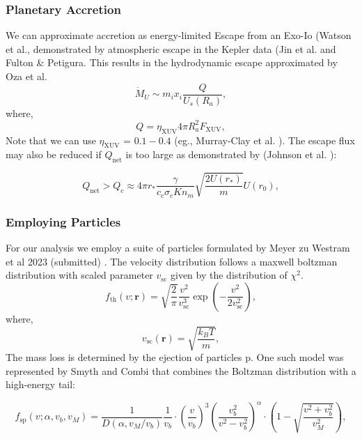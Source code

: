 \documentclass[journal,article,submit,pdftex,moreauthors]{Definitions/mdpi}
\begin{document}
\subsubsection{Planetary Accretion}
We can approximate accretion as energy-limited Escape from an Exo-Io (Watson et al.\cite{Watson_1981}, demonstrated by atmospheric escape in the Kepler data (Jin et al. \cite{Jin_2014} and Fulton
\& Petigura\cite{Fulton_Petigura_2018}. This results in the hydrodynamic escape approximated by Oza et al. \cite{Oza_2019}
\begin{equation}
\dot{M}_U \sim m_i x_i \frac{Q}{U_s\left(R_a\right)} ,
\end{equation}
where,
\begin{equation}
Q=\eta_{\mathrm{XUV}} 4 \pi R_a^2 F_{\mathrm{XUV}} ,
\end{equation}
Note that we can use $\eta_{\mathrm{XUV}}$ = $0.1 - 0.4$ (eg., Murray-Clay et al. \cite{Murray-Clay_2009}). The escape flux may also be reduced if $Q_\mathrm{net}$ is too large as demonstrated by (Johnson et al. \cite{Johnson_2013_Erratum}):

\begin{equation}
Q_{\mathrm{net}}>Q_c \approx 4 \pi r_* \frac{\gamma}{c_c \sigma_c K n_m} \sqrt{\frac{2 U\left(r_*\right)}{m}} U\left(r_0\right) ,
\end{equation}

\subsubsection{Employing Particles}
For our analysis we employ a suite of particles formulated by Meyer zu Westram et al 2023 (submitted) \cite{Meyer_zu_Westram}. The velocity distribution follows a maxwell boltzman distribution with scaled parameter $v_{\mathrm{sc}}$ given by the distribution of $\chi^2$. 
\begin{equation}
    f_{\mathrm{th}}(v ; \mathbf{r})=\sqrt{\frac{2}{\pi}} \frac{v^2}{v_{\mathrm{sc}}^3} \exp \left(-\frac{v^2}{2 v_{\mathrm{sc}}^2}\right) ,
\end{equation}
where,
\begin{equation}
    v_{\mathrm{sc}}(\mathbf{r})=\sqrt{\frac{k_B T}{m}} ,
\end{equation}
The mass loss is determined by the ejection of particles $\mathrm{p}$. One such model was represented by Smyth and Combi \cite{osti_6642954} that combines the Boltzman distribution with a high-energy tail:  

\begin{equation}
f_{\mathrm{sp}}\left(v ; \alpha, v_b, v_M\right)=\frac{1}{D\left(\alpha, v_M / v_b\right)} \frac{1}{v_b} \cdot\left(\frac{v}{v_b}\right)^3\left(\frac{v_b^2}{v^2-v_b^2}\right)^\alpha \cdot\left(1-\sqrt{\frac{v^2+v_b^2}{v_M^2}}\right) ,
\end{equation}
\end{document}
